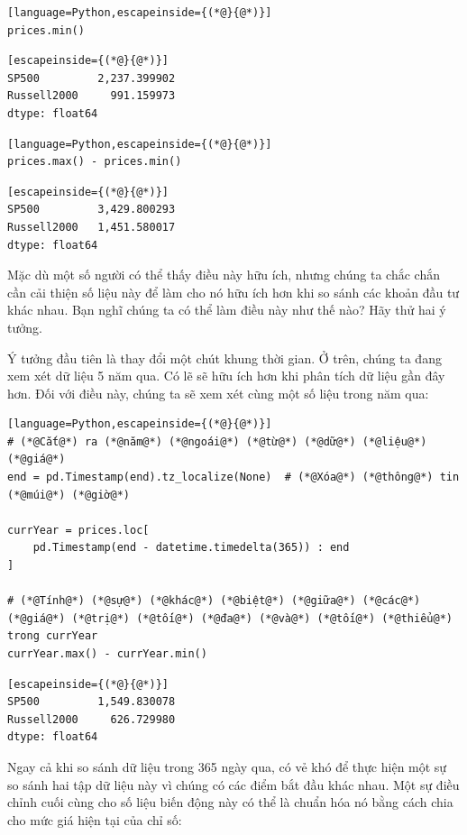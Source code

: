 \begin{lstlisting}[language=Python,escapeinside={(*@}{@*)}]
prices.min()
\end{lstlisting}

\begin{lstlisting}[escapeinside={(*@}{@*)}]
SP500         2,237.399902
Russell2000     991.159973
dtype: float64
\end{lstlisting}

\begin{lstlisting}[language=Python,escapeinside={(*@}{@*)}]
prices.max() - prices.min()
\end{lstlisting}

\begin{lstlisting}[escapeinside={(*@}{@*)}]
SP500         3,429.800293
Russell2000   1,451.580017
dtype: float64
\end{lstlisting}

Mặc dù một số người có thể thấy điều này hữu ích, nhưng chúng ta chắc chắn cần cải thiện số liệu này để làm cho nó hữu ích hơn khi so sánh các khoản đầu tư khác nhau. Bạn nghĩ chúng ta có thể làm điều này như thế nào? Hãy thử hai ý tưởng.

Ý tưởng đầu tiên là thay đổi một chút khung thời gian. Ở trên, chúng ta đang xem xét dữ liệu 5 năm qua. Có lẽ sẽ hữu ích hơn khi phân tích dữ liệu gần đây hơn. Đối với điều này, chúng ta sẽ xem xét cùng một số liệu trong năm qua:

\begin{lstlisting}[language=Python,escapeinside={(*@}{@*)}]
# (*@Cắt@*) ra (*@năm@*) (*@ngoái@*) (*@từ@*) (*@dữ@*) (*@liệu@*) (*@giá@*)
end = pd.Timestamp(end).tz_localize(None)  # (*@Xóa@*) (*@thông@*) tin (*@múi@*) (*@giờ@*)

currYear = prices.loc[
    pd.Timestamp(end - datetime.timedelta(365)) : end
]

# (*@Tính@*) (*@sự@*) (*@khác@*) (*@biệt@*) (*@giữa@*) (*@các@*) (*@giá@*) (*@trị@*) (*@tối@*) (*@đa@*) (*@và@*) (*@tối@*) (*@thiểu@*) trong currYear
currYear.max() - currYear.min()
\end{lstlisting}

\begin{lstlisting}[escapeinside={(*@}{@*)}]
SP500         1,549.830078
Russell2000     626.729980
dtype: float64
\end{lstlisting}

Ngay cả khi so sánh dữ liệu trong 365 ngày qua, có vẻ khó để thực hiện một sự so sánh hai tập dữ liệu này vì chúng có các điểm bắt đầu khác nhau. Một sự điều chỉnh cuối cùng cho số liệu biến động này có thể là chuẩn hóa nó bằng cách chia cho mức giá hiện tại của chỉ số:

